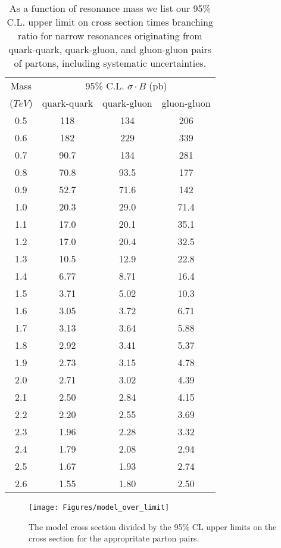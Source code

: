 \begin{table}[htbH]
\centering
\large
\begin{tabular}{|c|c|c|c|}\hline
Mass   &  \multicolumn{3}{c|}{95\% C.L. $\sigma\cdot B$ (pb)}\\
 ($TeV$) &  quark-quark      & quark-gluon  & gluon-gluon\\ \hline
0.5	 &  118	         &  134	         &  206  \\  
0.6	 &  182	         &  229	         &  339  \\  
0.7	 &  90.7         &  134	         &  281  \\  
0.8	 &  70.8	 &  93.5	 &  177  \\  
0.9	 &  52.7	 &  71.6	 &  142  \\  
1.0	 &  20.3	 &  29.0	 &  71.4 \\  
1.1	 &  17.0	 &  20.1	 &  35.1 \\  
1.2	 &  17.0	 &  20.4	 &  32.5 \\  
1.3	 &  10.5	 &  12.9	 &  22.8 \\  
1.4	 &  6.77	 &  8.71	 &  16.4 \\  
1.5	 &  3.71	 &  5.02	 &  10.3 \\  
1.6	 &  3.05	 &  3.72	 &  6.71 \\  
1.7	 &  3.13	 &  3.64	 &  5.88 \\  
1.8	 &  2.92	 &  3.41	 &  5.37 \\  
1.9	 &  2.73	 &  3.15	 &  4.78 \\  
2.0	 &  2.71	 &  3.02	 &  4.39 \\  
2.1	 &  2.50	 &  2.84	 &  4.15 \\  
2.2	 &  2.20	 &  2.55	 &  3.69 \\  
2.3	 &  1.96	 &  2.28	 &  3.32 \\  
2.4	 &  1.79	 &  2.08	 &  2.94 \\  
2.5	 &  1.67	 &  1.93	 &  2.74 \\
2.6      &  1.55         &  1.80         &  2.50  \\
\hline
\end{tabular}
\caption{As a function of resonance mass we list our 95\% C.L. upper limit on
cross section times branching ratio for narrow resonances originating from   
quark-quark, quark-gluon, and gluon-gluon pairs of partons,
including systematic uncertainties.}
\label{tabXsecLimit}
\end{table}


\begin{figure}[!ht]
  \begin{center}
    \texttt{[image: Figures/model\_over\_limit]}
    \caption{ The model cross section divided by the 95\% CL upper limits on the 
    cross section for the appropritate parton pairs.}
    \label{limit_ratio}
  \end{center}
\end{figure}



\clearpage
